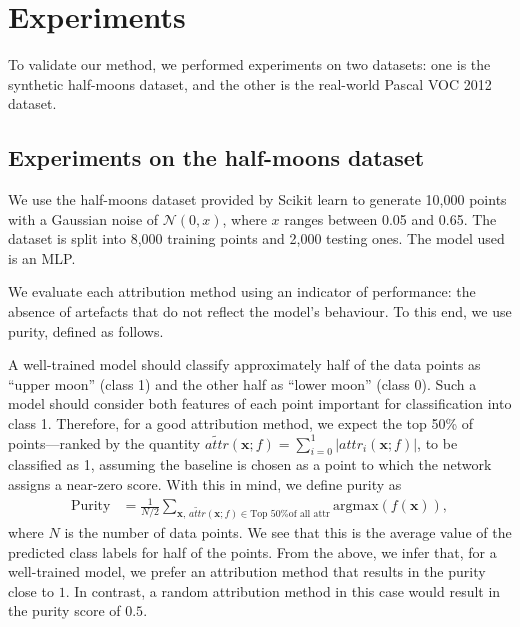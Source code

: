 \section{Experiments}
\label{sec:experiments}

To validate our method, we performed experiments on two datasets: one is the synthetic half-moons dataset, and the other is the real-world Pascal VOC 2012 dataset.

\subsection{Experiments on the half-moons dataset}
\label{subsec:half-moons}

We use the half-moons dataset provided by Scikit learn \citep{scikit-learn} to generate 10,000 points with a Gaussian noise of $\mathcal{N}(0, x)$, where $x$ ranges between 0.05 and 0.65. The dataset is split into 8,000 training points and 2,000 testing ones. The model used is an MLP.

We evaluate each attribution method using an indicator of performance: the absence of artefacts that do not reflect the model's behaviour. To this end, we use purity, defined as follows.

A well-trained model should classify approximately half of the data points as ``upper moon'' (class 1) and the other half as ``lower moon'' (class 0). Such a model should consider both features of each point important for classification into class 1. Therefore, for a good attribution method, we expect the top 50\% of points—ranked by the quantity $\widetilde{attr}(\textbf{x}; f) = \sum_{i=0}^1 |attr_i(\textbf{x}; f)|$, to be classified as 1, assuming the baseline is chosen as a point to which the network assigns a near-zero score. With this in mind, we define purity as
\begin{equation}
\begin{split}
    \textrm{Purity} &= \frac{1}{N/2}\sum_{\textbf{x}, \, \widetilde{attr}(\textbf{x}; f) \in \textrm{Top 50\% of all attr}} \textrm{argmax}(f(\textbf{x})),
\end{split}
\label{eq:moons-purity}
\end{equation}
where $N$ is the number of data points. We see that this is the average value of the predicted class labels for half of the points. From the above, we infer that, for a well-trained model, we prefer an attribution method that results in the purity close to $1$. In contrast, a random attribution method in this case would result in the purity score of $0.5$. 

